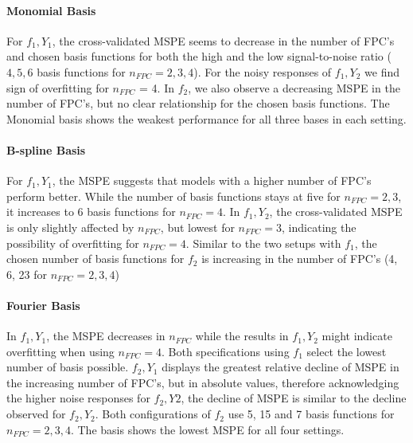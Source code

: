 \documentclass[11pt,twoside,a4paper]{article}
\begin{document}
	\paragraph{Monomial Basis}
	For $f_1,Y_1$, the cross-validated MSPE seems to decrease in the number of FPC's and chosen basis functions for both the high and the low signal-to-noise ratio ($4,5,6$ basis functions for $n_{FPC} = 2, 3, 4$). For the noisy responses of $f_1,Y_2$ we find sign of overfitting for $n_{FPC}$ = 4. In  $f_2$, we also observe a decreasing MSPE in the number of FPC's, but no clear relationship for the chosen basis functions. The Monomial basis shows the weakest performance for all three bases in each setting.
	\vspace{-0.2cm}
	
	\paragraph{B-spline Basis}
	For $f_1,Y_1$, the MSPE suggests that models with a higher number of FPC's perform better. While the number of basis functions stays at five for $n_{FPC} = 2,3$, it increases to 6 basis functions for $n_{FPC} = 4$. In $f_1,Y_2$, the cross-validated MSPE is only slightly affected by $n_{FPC}$, but lowest for $n_{FPC} = 3$, indicating the possibility of overfitting for $n_{FPC} = 4$. Similar to the two setups with $f_1$, the chosen number of basis functions for $f_2$ is increasing in the number of FPC's (4, 6, 23 for $n_{FPC} = 2, 3, 4$)
	\vspace{-0.2cm}
	
	\paragraph{Fourier Basis}
	In $f_1,Y_1$, the MSPE decreases in $n_{FPC}$ while the results in $f_1,Y_2$ might indicate overfitting when using $n_{FPC} = 4$. Both specifications using $f_1$ select the lowest number of basis  possible. $f_2,Y_1$ displays the greatest relative decline of MSPE in the increasing number of FPC's, but in absolute values, therefore acknowledging the higher noise responses for $f_2,Y2$, the decline of MSPE is similar to the decline observed for $f_2,Y_2$. Both configurations of $f_2$ use 5, 15 and 7 basis functions for $n_{FPC} = 2, 3, 4$. The basis shows the lowest MSPE for all four settings.
	\vspace{-0.2cm}	
	
\end{document}
